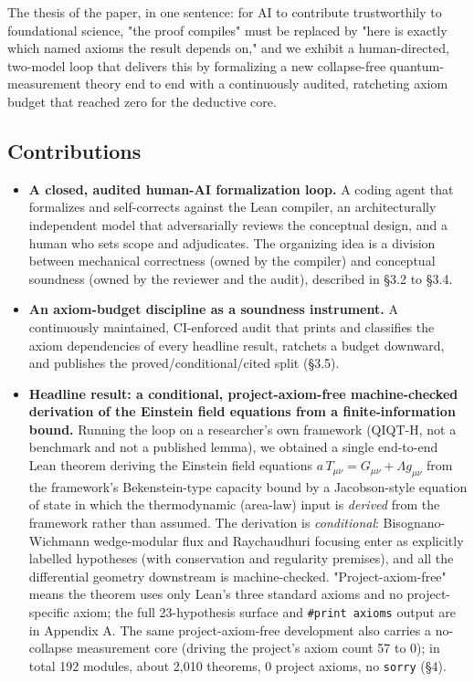 \documentclass[11pt]{article}
\begin{document}
The thesis of the paper, in one sentence: for AI to contribute trustworthily to foundational
science, "the proof compiles" must be replaced by "here is exactly which named axioms the result
depends on," and we exhibit a human-directed, two-model loop that delivers this by formalizing a
new collapse-free quantum-measurement theory end to end with a continuously audited, ratcheting
axiom budget that reached zero for the deductive core.

\subsection{Contributions}

\begin{itemize}
  \item \textbf{A closed, audited human-AI formalization loop.} A coding agent that formalizes and self-corrects against the Lean compiler, an architecturally independent model that adversarially reviews the conceptual design, and a human who sets scope and adjudicates. The organizing idea is a division between mechanical correctness (owned by the compiler) and conceptual soundness (owned by the reviewer and the audit), described in §3.2 to §3.4.
  \item \textbf{An axiom-budget discipline as a soundness instrument.} A continuously maintained, CI-enforced audit that prints and classifies the axiom dependencies of every headline result, ratchets a budget downward, and publishes the proved/conditional/cited split (§3.5).
  \item \textbf{Headline result: a conditional, project-axiom-free machine-checked derivation of the Einstein field equations from a finite-information bound.} Running the loop on a researcher's own framework (QIQT-H, not a benchmark and not a published lemma), we obtained a single end-to-end Lean theorem deriving the Einstein field equations $a\,T_{\mu\nu}=G_{\mu\nu}+\Lambda g_{\mu\nu}$ from the framework's Bekenstein-type capacity bound by a Jacobson-style equation of state in which the thermodynamic (area-law) input is \emph{derived} from the framework rather than assumed. The derivation is \emph{conditional}: Bisognano-Wichmann wedge-modular flux and Raychaudhuri focusing enter as explicitly labelled hypotheses (with conservation and regularity premises), and all the differential geometry downstream is machine-checked. "Project-axiom-free" means the theorem uses only Lean's three standard axioms and no project-specific axiom; the full 23-hypothesis surface and \texttt{\#print axioms} output are in Appendix A. The same project-axiom-free development also carries a no-collapse measurement core (driving the project's axiom count 57 to 0); in total 192 modules, about 2,010 theorems, 0 project axioms, no \texttt{sorry} (§4).

\end{itemize}
\end{document}
